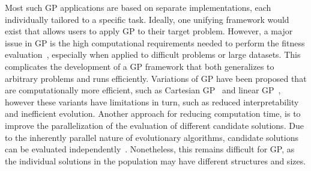 \documentclass{article}
\begin{document}
Most such GP applications are based on separate implementations, each individually tailored to a specific task. Ideally, one unifying framework would exist that allows users to apply GP to their target problem. However, a major issue in GP is the high computational requirements needed to perform the fitness evaluation~\cite{harding2007fast}, especially when applied to difficult problems or large datasets. This complicates the development of a GP framework that both generalizes to arbitrary problems and runs efficiently. Variations of GP have been proposed that are computationally more efficient, such as Cartesian GP~\cite{miller2015cartesian} and linear GP~\cite{brameier2007basic}, however these variants have limitations in turn, such as reduced interpretability and inefficient evolution. Another approach for reducing computation time, is to improve the parallelization of the evaluation of different candidate solutions. Due to the inherently parallel nature of evolutionary algorithms, candidate solutions can be evaluated independently~\cite{harding2007fast}. Nonetheless, this remains difficult for GP, as the individual solutions in the population may have different structures and sizes.
\noindent
\end{document}
